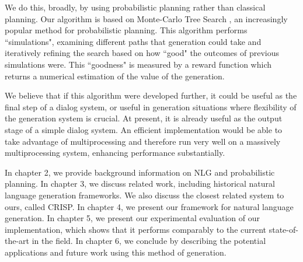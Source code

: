 We do this, broadly, by using probabilistic planning rather than classical planning.
Our algorithm is based on Monte-Carlo Tree Search \cite{kocsis_bandit_2006}, an increasingly
popular method for probabilistic planning.  This algorithm performs ``simulations",
examining different paths that generation could take and iteratively refining
the search based on how ``good" the outcomes of previous simulations were.
This ``goodness" is measured by a reward function which returns a numerical
estimation of the value of the generation.

We believe that if this algorithm were developed further, it could be useful as the
final step of a dialog system, or useful in generation situations where flexibility of the
generation system is crucial.  At present, it is already useful as the output stage of
a simple dialog system.  An efficient implementation would be able to take advantage
of multiprocessing and therefore run very well on a massively multiprocessing system,
enhancing performance substantially.

In chapter 2, we provide background information on NLG and probabilistic planning.  In chapter 3,
we discuss related work, including historical natural language generation frameworks.  We also
discuss the closest related system to ours, called CRISP.  In chapter 4, we present our framework
for natural language generation.  In chapter 5, we present our experimental evaluation of
our implementation, which shows that it performs comparably to the current state-of-the-art in
the field.  In chapter 6, we conclude by describing the potential applications and future work
using this method of generation.